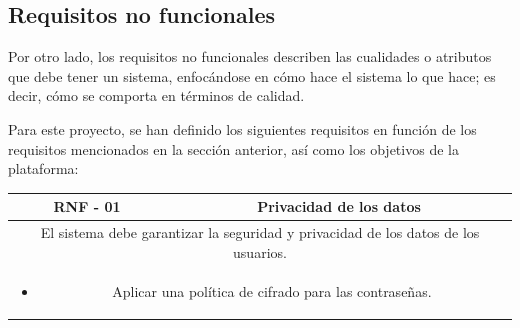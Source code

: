                 \newpage
        
        \subsection{Requisitos no funcionales}
            \label{sec:requisitos-nofuncionales}
            
            Por otro lado, los requisitos no funcionales describen las cualidades o atributos que debe tener un sistema, enfocándose en cómo hace el sistema lo que hace; es decir, cómo se comporta en términos de calidad.
            
            Para este proyecto, se han definido los siguientes requisitos en función de los requisitos mencionados en la sección anterior, así como los objetivos de la plataforma:
            
            \begin{table}[!htbp]
                \centering

                \begin{tabular}{|c|c|}
                    \hline
                    \textbf{RNF - 01} & \textbf{Privacidad de los datos} \\
                    \hline
                    \multicolumn{2}{|p{15cm}|}{
                        El sistema debe garantizar la seguridad y privacidad de los datos de los usuarios.
                    } \\
                    \hline
                    \multicolumn{2}{|p{15cm}|}{
                        \begin{itemize}
                            \item Aplicar una política de cifrado para las contraseñas.
                        \end{itemize}
                        } \\
                    \hline
                \end{tabular}

                \label{tab:RNF1}
            \end{table}
            
